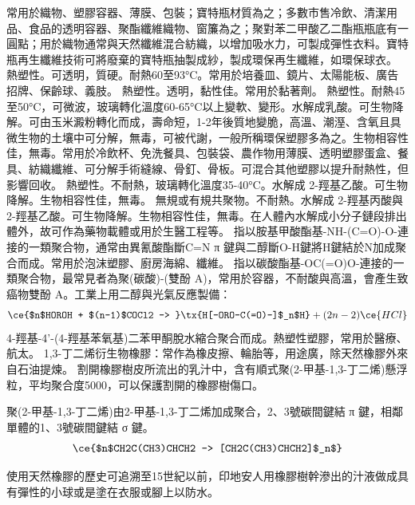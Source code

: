 \documentclass[a4paper,12pt]{report}
\begin{document}
\begin{itemize}
\begin{itemize}
常用於織物、塑膠容器、薄膜、包裝；寶特瓶材質為之；多數市售冷飲、清潔用品、食品的透明容器、聚酯纖維織物、窗簾為之；聚對苯二甲酸乙二酯瓶瓶底有一圓點；用於織物通常與天然纖維混合紡織，以增加吸水力，可製成彈性衣料。寶特瓶再生纖維技術可將廢棄的寶特瓶抽製成紗，製成環保再生纖維，如環保球衣。
熱塑性。可透明，質硬。耐熱60至93°C。常用於培養皿、鏡片、太陽能板、廣告招牌、保齡球、義肢。
熱塑性。透明，黏性佳。常用於黏著劑。
熱塑性。耐熱45至50°C，可微波，玻璃轉化溫度60-65°C以上變軟、變形。水解成乳酸。可生物降解。可由玉米澱粉轉化而成，壽命短，1-2年後質地變脆，高溫、潮溼、含氧且具微生物的土壤中可分解，無毒，可被代謝，一般所稱環保塑膠多為之。生物相容性佳，無毒。常用於冷飲杯、免洗餐具、包裝袋、農作物用薄膜、透明塑膠蛋盒、餐具、紡織纖維、可分解手術縫線、骨釘、骨板。可混合其他塑膠以提升耐熱性，但影響回收。
熱塑性。不耐熱，玻璃轉化溫度35-40°C。水解成 2-羥基乙酸。可生物降解。生物相容性佳，無毒。
無規或有規共聚物。不耐熱。水解成 2-羥基丙酸與 2-羥基乙酸。可生物降解。生物相容性佳，無毒。在人體內水解成小分子鏈段排出體外，故可作為藥物載體或用於生醫工程等。
指以胺基甲酸酯基-NH-(C=O)-O-連接的一類聚合物，通常由異氰酸酯斷C=N π 鍵與二醇斷O-H鍵將H鍵結於N加成聚合而成。常用於泡沫塑膠、廚房海綿、纖維。
指以碳酸酯基-OC(=O)O-連接的一類聚合物，最常見者為聚(碳酸)-(雙酚 A)，常用於容器，不耐酸與高溫，會產生致癌物雙酚 A。工業上用二醇與光氣反應製備：
\[\ce{$n$HOROH + $(n-1)$COCl2 -> }\tx{H[-ORO-C(=O)-]$_n$H} + (2n-2)\ce{HCl}\]
4-羥基-4'-(4-羥基苯氧基)二苯甲酮脫水縮合聚合而成。熱塑性塑膠，常用於醫療、航太。
1,3-丁二烯衍生物橡膠：常作為橡皮擦、輪胎等，用途廣，除天然橡膠外來自石油提煉。
割開橡膠樹皮所流出的乳汁中，含有順式聚(2-甲基-1,3-丁二烯)懸浮粒，平均聚合度5000，可以保護割開的橡膠樹傷口。

聚(2-甲基-1,3-丁二烯)由2-甲基-1,3-丁二烯加成聚合，2、3號碳間鍵結 π 鍵，相鄰單體的1、3號碳間鍵結 σ 鍵。
\[\ce{$n$CH2C(CH3)CHCH2 -> [CH2C(CH3)CHCH2]$_n$}\]

使用天然橡膠的歷史可追溯至15世紀以前，印地安人用橡膠樹幹滲出的汁液做成具有彈性的小球或是塗在衣服或腳上以防水。


\end{itemize}
\end{itemize}
\end{document}
